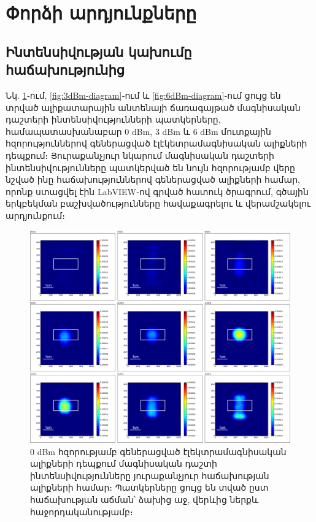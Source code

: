 \documentclass[12pt, fleqn]{report}
\begin{document}
\newpage

\section{Փորձի արդյունքները}
\subsection{Ինտենսիվության կախումը հաճախությունից}  
 Նկ. \ref{fig:0dBm-diagram}֊ում, \ref{fig:3dBm-diagram}֊ում և \ref{fig:6dBm-diagram}֊ում ցույց են տրված ալիքատարային անտենայի ճառագայթած մագնիսական դաշտերի ինտենսիվությունների պատկերները, համապատասխանաբար 0 dBm, 3 dBm և 6 dBm մուտքային հզորություններով գեներացված էլէկետրամագնիսական ալիքների դեպքում։ Յուրաքանչյուր նկարում մագնիսական դաշտերի ինտենսիվությունները պատկերված են նույն հզորությամբ վերը նշված ինը հաճախություններով գեներացված ալիքների համար, որոնք ստացվել էին LabVIEW֊ով գրված հատուկ ծրագրում, գծային երկբեկման բաշխվածությունները հավաքագրելու և վերամշակելու արդյունքում։
\begin{figure}
    \begin{adjustwidth}{-0.8cm}{}
    \centering
    \includegraphics[width=1.0\linewidth]{data/experiment-results/free field of antenna, 6-14ghz, 0dbm generator output, distance 5mm.png}
    \caption{0 dBm հզորությամբ գեներացված էլեկտրամագնիսական ալիքների դեպքում մագնիսական դաշտի ինտենսիվությունները յուրաքանչյուր հաճախության ալիքների համար։ Պատկերները ցույց են տված ըստ հաճախության աճման՝ ձախից աջ, վերևից ներքև հաջորդականությամբ։}
    \label{fig:0dBm-diagram}
\end{adjustwidth}
\end{figure}
\end{document}
